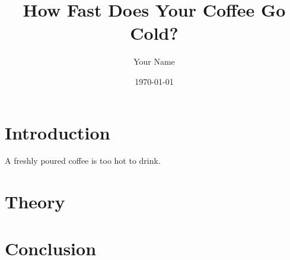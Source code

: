 \documentclass[a4paper,11pt]{article}
\title{How Fast Does Your Coffee Go Cold?}
\author{Your Name}
\date{\today}
\begin{document}
\maketitle

\section{Introduction}
A freshly poured coffee is too hot to drink.

\section{Theory}
\section{Conclusion}
\end{document}
